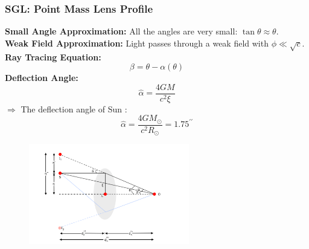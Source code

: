 \documentclass[xcolor=table,bigger]{beamer}
\begin{document}
\begin{frame}
 \frametitle{\textbf{SGL}: Point Mass Lens Profile}

\begin{minipage}{0.45\textwidth}
 \textbf{Small Angle Approximation: } All the angles are very small: $\tan{{\theta}}\approx{\theta}$.
\vspace{1mm}\\
 \textbf{Weak Field Approximation: }Light passes through a weak field with $\phi\ll\sqrt{c}$.
\vspace{1mm}\\
 \textbf{Ray Tracing Equation:} 
$$\beta=\theta-\alpha(\theta)$$
 \textbf{Deflection Angle:} 
$$
\hat{\alpha}=\dfrac{4 G M}{c^{2} \xi}
$$
$\Rightarrow$ The deflection angle of Sun :
$$
\hat{\alpha}=\dfrac{4 G M_{\odot}}{c^{2} R_{\odot}}=1.75^{\prime \prime}
$$

\end{minipage}%
\hfill
\begin{minipage}{0.55\textwidth}
\begin{figure}[ht!]
\centering
\includegraphics[width=70mm]{sgl1}
\end{figure} 
\end{minipage}%
 \end{frame}
\end{document}
